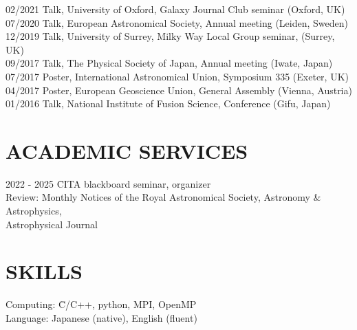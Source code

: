 \documentclass[]{res}
\begin{document}
\begin{resume}
\begin{tabbing}
    02/2021 \hspace{2mm} \>Talk, University of Oxford, Galaxy Journal Club seminar (Oxford, UK)\\
    07/2020 \hspace{2mm} \>Talk, European Astronomical Society, Annual meeting (Leiden, Sweden)\\
    12/2019 \hspace{2mm} \>Talk, University of Surrey, Milky Way Local Group seminar, (Surrey, UK)\\
    09/2017 \hspace{2mm} \>Talk, The Physical Society of Japan, Annual meeting (Iwate, Japan)\\
    07/2017 \hspace{2mm} \>Poster, International Astronomical Union, Symposium 335 (Exeter, UK)\\
    04/2017 \hspace{2mm} \>Poster, European Geoscience Union, General Assembly (Vienna, Austria)\\
    01/2016 \hspace{2mm} \>Talk, National Institute of Fusion Science, Conference (Gifu, Japan)
\end{tabbing}

\section{ACADEMIC SERVICES}
\noindent
\begin{tabbing}
    2022 - 2025 \hspace{2mm} \=CITA blackboard seminar, organizer\\
    Review: \>Monthly Notices of the Royal Astronomical Society, Astronomy \& Astrophysics, \\
    \>Astrophysical Journal
\end{tabbing}

\section{SKILLS}
\noindent
\begin{tabbing}
    Computing: \=C/C++, python, MPI, OpenMP \\
    Language: \>Japanese (native), English (fluent)
\end{tabbing}



\end{resume}
\end{document}
